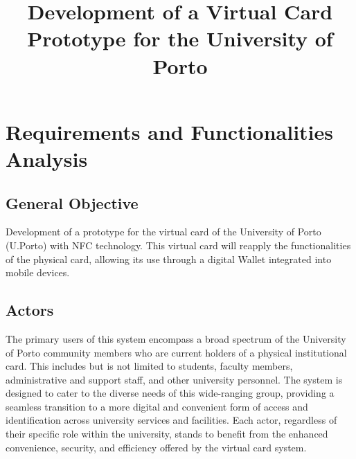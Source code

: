 \documentclass[10pt]{article}
\title{\vspace{-3cm}Development of a Virtual Card Prototype for the University of Porto}
\date{}
\begin{document}
\maketitle

\section{Requirements and Functionalities Analysis}

\subsection{General Objective}
Development of a prototype for the virtual card of the University of Porto (U.Porto) with NFC technology. This virtual card will reapply the functionalities of the physical card, allowing its use through a digital Wallet integrated into mobile devices.

\subsection{Actors}
The primary users of this system encompass a broad spectrum of the University of Porto community members who are current holders of a physical institutional card. This includes but is not limited to students, faculty members, administrative and support staff, and other university personnel. The system is designed to cater to the diverse needs of this wide-ranging group, providing a seamless transition to a more digital and convenient form of access and identification across university services and facilities. Each actor, regardless of their specific role within the university, stands to benefit from the enhanced convenience, security, and efficiency offered by the virtual card system.
\end{document}

